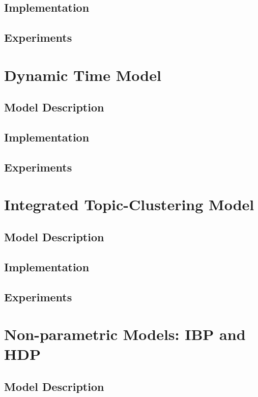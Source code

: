 \documentclass{article}
\begin{document}
\subsection{Implementation} 
\subsection{Experiments} 



\section{Dynamic Time Model} 
\label{dtmsec}
\subsection{Model Description} 
\subsection{Implementation} 
\subsection{Experiments} 




\section{Integrated Topic-Clustering Model} 
\label{intsec}
\subsection{Model Description} 
\subsection{Implementation} 
\subsection{Experiments} 



\section{Non-parametric Models: IBP and HDP} 
\label{nonparametricsec}
\subsection{Model Description} 
\end{document}
